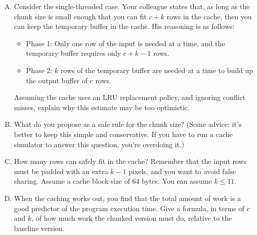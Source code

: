 \documentclass[11pt]{article}
\newenvironment{choice}{\begin{enumerate}[A.]}{\end{enumerate}}
\newenvironment{answer}{\begin{minipage}[c][2.0in]{\textwidth}}{\end{minipage}}
\begin{document}
\begin{choice}
\item
Consider the single-threaded case.  Your colleague states that, as
long as the chunk size is small enough that you can fit $c + k$
rows in the cache, then you can keep the temporary buffer in the cache.  His reasoning is as follows:
\begin{itemize}
\item Phase 1: Only one row of the input is needed at a time, and the temporary buffer requires only $c+k-1$ rows.
\item Phase 2: $k$ rows of the temporary buffer are needed at a time to build up the output buffer of $c$ rows.
\end{itemize}
Assuming the cache uses an LRU replacement policy, and ignoring 
conflict misses, explain why this estimate may be too optimistic.

\begin{answer}



\end{answer}

\item
What do you propose as a safe rule for the chunk size?  (Some advice:
it's better to keep this simple and conservative.  If you have to run
a cache simulator to answer this question, you're overdoing it.)

\begin{answer}

\end{answer}

\item
How many rows can safely fit in the cache?  Remember that the
input rows must be padded with an extra $k-1$ pixels, and you want
to avoid false sharing.  Assume a cache block size of 64 bytes.  You can assume $k \leq 11$.

\begin{answer}

\end{answer}

\newpage

\item
When the caching works out, you find that the total amount of
work is a good predictor of the program execution time.  Give a formula,
in terms of $c$ and $k$, of how much work the chunked version must do,
relative to the baseline version.


\end{choice}
\end{document}
